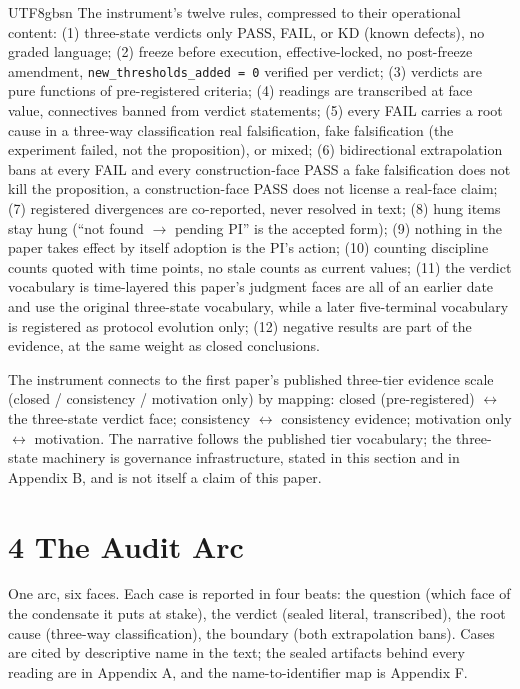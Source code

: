 \documentclass[11pt,letterpaper]{article}
\begin{document}
\begin{CJK}{UTF8}{gbsn}
The instrument's twelve rules, compressed to their operational content: (1) three-state verdicts only \textemdash{} PASS, FAIL, or KD (known defects), no graded language; (2) freeze before execution, effective-locked, no post-freeze amendment, \texttt{new\_thresholds\_added = 0} verified per verdict; (3) verdicts are pure functions of pre-registered criteria; (4) readings are transcribed at face value, connectives banned from verdict statements; (5) every FAIL carries a root cause in a three-way classification \textemdash{} real falsification, fake falsification (the experiment failed, not the proposition), or mixed; (6) bidirectional extrapolation bans at every FAIL and every construction-face PASS \textemdash{} a fake falsification does not kill the proposition, a construction-face PASS does not license a real-face claim; (7) registered divergences are co-reported, never resolved in text; (8) hung items stay hung (``not found \ensuremath{\to} pending PI'' is the accepted form); (9) nothing in the paper takes effect by itself \textemdash{} adoption is the PI's action; (10) counting discipline \textemdash{} counts quoted with time points, no stale counts as current values; (11) the verdict vocabulary is time-layered \textemdash{} this paper's judgment faces are all of an earlier date and use the original three-state vocabulary, while a later five-terminal vocabulary is registered as protocol evolution only; (12) negative results are part of the evidence, at the same weight as closed conclusions.

The instrument connects to the first paper's published three-tier evidence scale (closed / consistency / motivation only) by mapping: closed (pre-registered) \ensuremath{\leftrightarrow} the three-state verdict face; consistency \ensuremath{\leftrightarrow} consistency evidence; motivation only \ensuremath{\leftrightarrow} motivation. The narrative follows the published tier vocabulary; the three-state machinery is governance infrastructure, stated in this section and in Appendix B, and is not itself a claim of this paper.

\section*{4 The Audit Arc}

One arc, six faces. Each case is reported in four beats: the question (which face of the condensate it puts at stake), the verdict (sealed literal, transcribed), the root cause (three-way classification), the boundary (both extrapolation bans). Cases are cited by descriptive name in the text; the sealed artifacts behind every reading are in Appendix A, and the name-to-identifier map is Appendix F.


\end{CJK}
\end{document}
